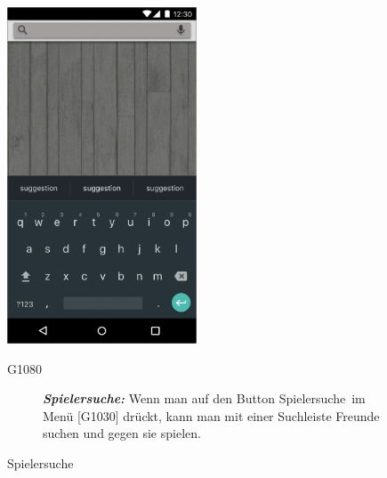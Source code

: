 \documentclass[parskip=full]{scrartcl}
\begin{document}
\begin{figure}[htp]
		\begin{minipage}[t]{6cm}
			\vspace{0pt}
			\includegraphics[height=100mm]{spielersuche.png}
			\caption{Spielersuche}
			\label{fig:Spielersuche}
		\end{minipage}
		\hfill
		\begin{minipage}[t]{6cm}
			\vspace{0pt}
			\begin{description}
				\item[G1080] \textbf{\textit{Spielersuche: }} Wenn man auf den Button \glqq Spielersuche\grqq\ im Menü [G1030] drückt, kann man mit einer Suchleiste Freunde suchen und gegen sie spielen.
			\end{description}
		\end{minipage}
	\end{figure}
	
\end{document}
